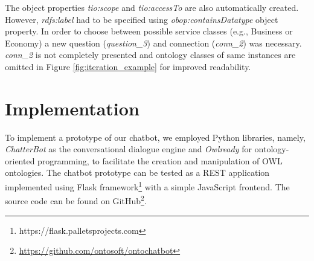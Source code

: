 \documentclass[runningheads]{llncs}
\begin{document}
The object properties \textit{tio:scope} and \textit{tio:accessTo} are also automatically created. However, \textit{rdfs:label} had to be specified using \textit{obop:containsDatatype} object property. In order to choose between possible service classes (e.g., Business or Economy) a new question (\textit{question\_3}) and connection (\textit{conn\_2}) was necessary. \textit{conn\_2} is not completely presented and ontology classes of same instances are omitted in Figure \ref{fig:iteration_example} for improved readability. 


\FloatBarrier 
\section {Implementation}
To implement a prototype of our chatbot, we employed Python libraries, namely, \textit{ChatterBot} as the conversational dialogue engine and \textit{Owlready} \cite{lamy2017owlready} for ontology-oriented programming, to facilitate the creation and manipulation of OWL ontologies. The chatbot prototype can be tested as a REST application implemented using Flask framework\footnote{\label{flaskfootnote}https://flask.palletsprojects.com} with a simple JavaScript frontend. The source code can be found on GitHub\footnote{\url{https://github.com/ontosoft/ontochatbot}}. 
\end{document}
